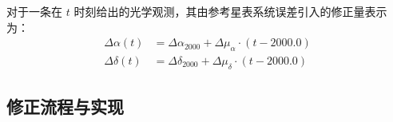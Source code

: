 \documentclass{aastex701}
\begin{document}
对于一条在 $t$ 时刻给出的光学观测，其由参考星表系统误差引入的修正量表示为：
\begin{equation}
\begin{split}
\Delta\alpha(t) &= \Delta\alpha_{2000} + \Delta\mu_{\alpha} \cdot (t - 2000.0)\\
\Delta\delta(t) &= \Delta\delta_{2000} + \Delta\mu_{\delta} \cdot (t - 2000.0)
\end{split}
\end{equation}

\subsection{修正流程与实现} \label{subsec:procedure}
\end{document}
